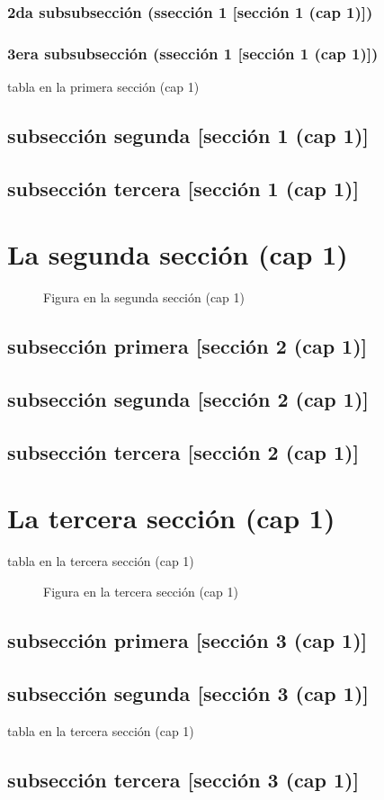 \documentclass[12pt,a4paper]{report}
\begin{document}
\subsubsection{2da subsubsección (ssección 1 [sección 1 (cap 1)])}
\subsubsection{3era subsubsección (ssección 1 [sección 1 (cap 1)])}
\begin{table}[H]
\caption{tabla en la primera sección (cap 1)}
\end{table}
\subsection{subsección segunda [sección 1 (cap 1)]}
\subsection{subsección tercera [sección 1 (cap 1)]}
\section{La segunda sección (cap 1)}
\begin{figure}[H]
\caption{Figura en la segunda sección (cap 1)}
\end{figure}
\subsection{subsección primera [sección 2 (cap 1)]}
\subsection{subsección segunda [sección 2 (cap 1)]}
\subsection{subsección tercera [sección 2 (cap 1)]}
\section{La tercera sección (cap 1)}
\begin{table}[H]
\caption{tabla en la tercera sección (cap 1)}
\end{table}
\begin{figure}[H]
\caption{Figura en la tercera sección (cap 1)}
\end{figure}
\subsection{subsección primera [sección 3 (cap 1)]}
\subsection{subsección segunda [sección 3 (cap 1)]}
\begin{table}[H]
\caption{tabla en la tercera sección (cap 1)}
\end{table}
\subsection{subsección tercera [sección 3 (cap 1)]}
\end{document}

